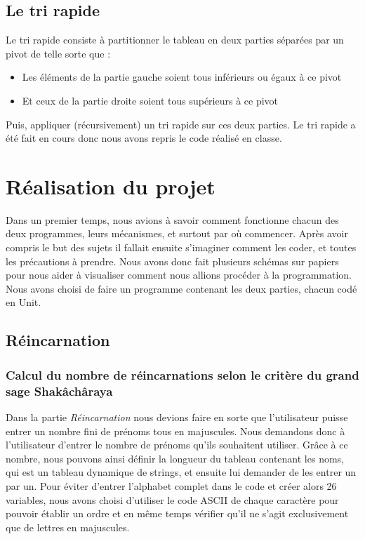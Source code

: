 \documentclass[13pt]{article}
\begin{document}
\subsection{Le tri rapide}
Le tri rapide consiste à partitionner le tableau en deux parties séparées par un pivot de telle sorte que :
\begin{itemize}
\item Les éléments de la partie gauche soient tous inférieurs ou égaux à ce pivot
\item Et ceux de la partie droite soient tous supérieurs à ce pivot
\end{itemize}
Puis, appliquer (récursivement) un tri rapide sur ces deux parties. Le tri rapide a été fait en cours donc nous avons repris le code réalisé en classe.
\section{Réalisation du projet}
Dans un premier temps, nous avions à savoir comment fonctionne chacun des deux programmes, leurs mécanismes, et surtout par où commencer. Après avoir compris le but des sujets il fallait ensuite s'imaginer comment les coder, et toutes les précautions à prendre. Nous avons donc fait plusieurs schémas sur papiers pour nous aider à visualiser comment nous allions procéder à la programmation. Nous avons choisi de faire un programme contenant les deux parties, chacun codé en Unit.
\subsection{Réincarnation}
\subsubsection*{Calcul du nombre de réincarnations selon le critère du grand sage Shakâchâraya}
Dans la partie \emph{Réincarnation} nous devions faire en sorte que l'utilisateur puisse entrer un nombre fini de prénoms tous en majuscules. Nous demandons donc à l'utilisateur d'entrer le nombre de prénoms qu'ils souhaitent utiliser. Grâce à ce nombre, nous pouvons ainsi définir la longueur du tableau contenant les noms, qui est un tableau dynamique de strings, et ensuite lui demander de les entrer un par un. Pour éviter d'entrer l'alphabet complet dans le code et créer alors 26 variables, nous avons choisi d'utiliser le code ASCII de chaque caractère pour pouvoir établir un ordre et en même temps vérifier qu'il ne s'agit exclusivement que de lettres en majuscules. 
\end{document}
